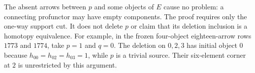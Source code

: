 \begin{remark*}
The absent arrows between $p$ and some objects of $E$ cause no
problem: a connecting profunctor may have empty components.
The proof requires only the one-way support cut. It does not
delete $p$ or claim that its deletion inclusion is a homotopy
equivalence. For example, in the frozen four-object eighteen-arrow
rows $1773$ and $1774$, take $p=1$ and $q=0$. The deletion on
$0,2,3$ has initial object $0$ because $h_{00}=h_{02}=h_{03}=1$,
while $p$ is a trivial source. Their six-element corner at $2$
is unrestricted by this argument.
\end{remark*}

